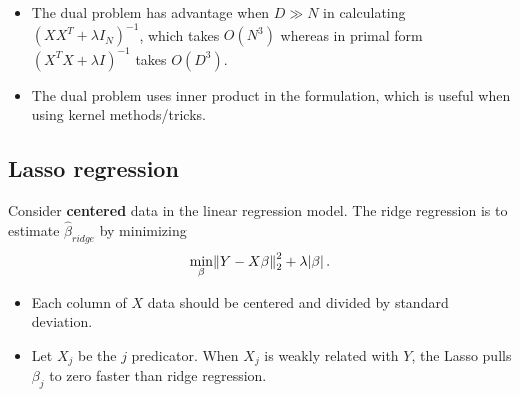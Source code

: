 \begin{refsection}
\begin{remark}\hfill
\begin{itemize}
    \item The dual problem has advantage when $D\gg N$ in calculating $(XX^T + \lambda I_N)^{-1}$, which takes $O(N^3)$ whereas in primal form $(X^TX + \lambda I)^{-1}$ takes $O(D^3)$.
    \item The dual problem uses inner product in the formulation, which is useful when using kernel methods/tricks. 
\end{itemize}
\end{remark}



\subsection{Lasso regression}

\begin{definition}
	Consider \textbf{centered} data in the linear regression model. The ridge regression is to estimate $\hat{\beta}_{ridge}$ by minimizing
	$$\min_{\beta} \norm{Y - X\beta}_2^2 + \lambda \abs{\beta}.$$
\end{definition}


\begin{remark}\hfill
	\begin{itemize}
		\item Each column of $X$ data should be centered and divided by standard deviation.  
	\end{itemize}
\end{remark}

\begin{remark}\hfill
	\begin{itemize}
		\item Let $X_j$ be the $j$ predicator. When $X_j$ is weakly related with $Y$, the Lasso pulls $\beta_j$ to zero faster than ridge regression.
	\end{itemize}
\end{remark}








\begin{lemma}
	

\end{lemma}
\end{refsection}
